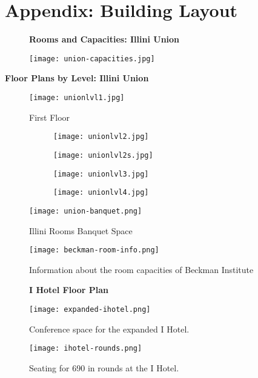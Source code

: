 \section{Appendix: Building Layout}
\label{appendix:building}
\begin{figure}[H]
	\centering
	\textbf{Rooms and Capacities: Illini Union} \par\medskip
	\texttt{[image: union-capacities.jpg]}
\end{figure}

\newpage
{\centering\textbf{Floor Plans by Level: Illini Union} \par\medskip}
\begin{figure}[H]
	\centering
	\texttt{[image: unionlvl1.jpg]}
	\caption{First Floor}
\end{figure}

\begin{figure}[H]
	\centering
	\begin{subfigure}{0.5\textwidth}
		\centering
		\texttt{[image: unionlvl2.jpg]}
	\end{subfigure}%
	\begin{subfigure}{0.5\textwidth}
		\centering
		\texttt{[image: unionlvl2s.jpg]}
	\end{subfigure}
	\begin{subfigure}{0.5\textwidth}
		\centering
		\texttt{[image: unionlvl3.jpg]}
	\end{subfigure}%
	\begin{subfigure}{0.5\textwidth}
		\centering
		\texttt{[image: unionlvl4.jpg]}
	\end{subfigure}		
\end{figure}

\begin{figure}
	\centering
	\texttt{[image: union-banquet.png]}
	\caption{Illini Rooms Banquet Space}
\end{figure}

\begin{figure}
	\centering
	\texttt{[image: beckman-room-info.png]}
	\caption{Information about the room capacities of Beckman Institute}
\end{figure}

\vspace{1cm}
\begin{figure}[H]
	\centering
	\textbf{I Hotel Floor Plan} \par\medskip
	\texttt{[image: expanded-ihotel.png]}
	\caption{Conference space for the expanded I Hotel.}
\end{figure}
\begin{figure}[H]
	\centering
	\texttt{[image: ihotel-rounds.png]}
	\caption{Seating for 690 in rounds at the I Hotel.}
\end{figure}
% 